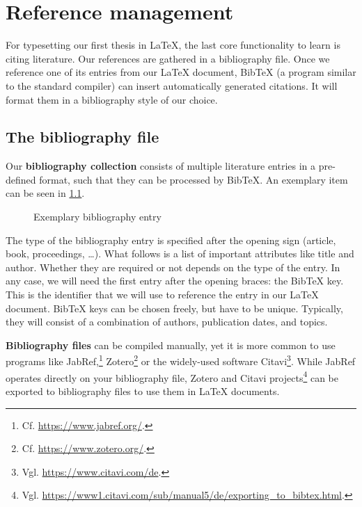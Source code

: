 \chapter{Reference management}
\label{sec:literature}

For typesetting our first thesis in \LaTeX{}, the last core functionality to learn is citing literature.
Our references are gathered in a bibliography file.
Once we reference one of its entries from our \LaTeX{} document, Bib\TeX{} (a 
program similar to the standard  compiler)
can insert automatically generated citations.
It will format them in a bibliography style of our choice.

\section{The bibliography file}
Our \textbf{bibliography collection} consists of multiple literature entries in a pre-defined format, such that they can be processed by Bib\TeX{}.
An exemplary item can be seen in \cref{lst:bibfile-sample-entry}.

\begin{figure}[H]

  \caption{Exemplary bibliography entry}
  \label{lst:bibfile-sample-entry}
\end{figure}

The type of the bibliography entry is specified after the opening  sign (article, book, proceedings, …).
What follows is a list of important attributes like title and author.
Whether they are required or not depends on the type of the entry.
In any case, we will need the first entry after the opening braces: the Bib\TeX{} key.
This is the identifier that we will use to reference the entry in our \LaTeX{} document.
Bib\TeX{} keys can be chosen freely, but have to be unique.
Typically, they will consist of a combination of authors, publication dates, and topics.\newpage

\textbf{Bibliography files} can be compiled manually, yet it is more common to use programs like JabRef,\footnote{Cf. \url{https://www.jabref.org/}.} Zotero\footnote{Cf. \url{https://www.zotero.org/}.} or the widely-used software Citavi\footnote{Vgl. \url{https://www.citavi.com/de}.}.
While JabRef operates directly on your bibliography file, Zotero and Citavi projects\footnote{Vgl. \url{https://www1.citavi.com/sub/manual5/de/exporting_to_bibtex.html}.} can be exported to bibliography files to use them in \LaTeX{} documents.

